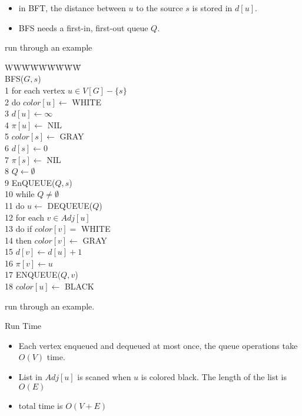 \documentclass{beamer}
\begin{document}
\begin{frame}{}

\begin{itemize}
\item in BFT, the distance between $u$ to the source $s$ is stored in
 $d[u]$.  
\item BFS needs a first-in, first-out queue $Q$.  
\end{itemize}
{\small run through an example}
\end{frame}

\begin{frame}{}

\begin{small}
\begin{tabbing}
WW\=W\=W\=W\=W\=W\=W\=W \kill \\ 
BFS($G,s$) \\
1 \> for each vertex $u\in V[G]-\{s\}$ \\
2 \>\> do $color[u]\leftarrow$ WHITE \\
3 \>\>\> $d[u]\leftarrow \infty$ \\
4 \>\>\> $\pi[u] \leftarrow$ NIL \\
5 \> $color[s]\leftarrow $ GRAY \\
6 \> $d[s]\leftarrow 0$ \\
7 \> $\pi[s] \leftarrow $ NIL \\
8 \> $Q\leftarrow \emptyset$ \\
9 \> EnQUEUE($Q,s$) \\
10 \> while $Q\ne \emptyset$ \\
11 \>\> do $u\leftarrow$ DEQUEUE($Q$) \\
12 \>\>\> for each $v\in Adj[u]$ \\
13 \>\>\>\> do if $color[v]=$ WHITE \\
14 \>\>\>\>\> then $color[v]\leftarrow $ GRAY \\
15 \>\>\>\>\>\> $d[v]\leftarrow d[u]+1$ \\
16 \>\>\>\>\>\> $\pi[v]\leftarrow u$ \\
17 \>\>\>\>\>\> ENQUEUE($Q,v$) \\
18 \>\>\> $color[u]\leftarrow$ BLACK 
\end{tabbing}
run through an example.
\end{small}
\end{frame}

\begin{frame}{Run Time}

\begin{itemize}
\item Each vertex enqueued and dequeued at most once, the queue operations
 take $O(V)$ time.  
\item List in $Adj[u]$ is scaned when $u$ is colored black.  The length of the
 list is $O(E)$
\item total time is $O(V+E)$
\end{itemize}
\end{frame}
\end{document}
